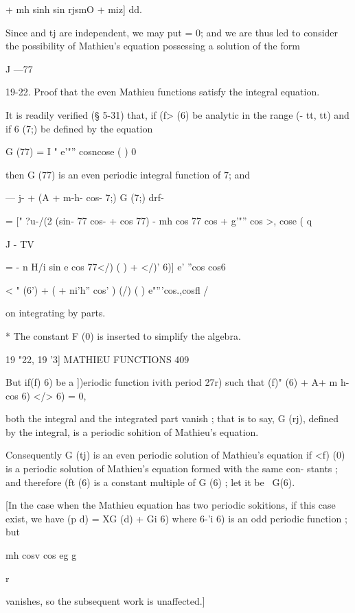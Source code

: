 + mh sinh   sin rjsmO + miz] dd. 

Since   and tj are independent, we may put   = 0; and we are thus led to 
consider the possibility of Mathieu's equation possessing a solution of the 
form 

J —77 

19-22. Proof that the even Mathieu functions satisfy the integral equation. 

It is readily verified (§ 5-31) that, if (f> (6) be analytic in the range (- tt, tt) 
and if 6 (7;) be defined by the equation 

G (77) = I " e'"'' cosncose   ( )  0  

then G (77) is an even periodic integral function of 7; and 

— j-  + (A + m-h- cos- 7;) G (7;) 
drf- 

= ["  ?u-/(2 (sin- 77 cos-   + cos  77) - mh cos 77 cos   +    g'"'' cos >, cose   (  q 

J - TV 

= - n H/i sin e cos 77</) ( ) + </)'  6)] e' ''cos cos6 

 < " (6') + (  + ni'h'' cos' ) (/) ( )  e"'''cos.,cosfl  /  



on integrating by parts. 

* The constant F (0) is inserted to simplify the algebra. 



19 "22, 19 '3] MATHIEU FUNCTIONS 409 

But if(f) 6) be a ])eriodic function  ivith period 27r) such that 
(f)" (6) +  A+ m h- cos  6) </>  6) = 0, 

both the integral and the integrated part vanish ; that is to say, G (rj), defined 
by the integral, is a periodic sohition of Mathieu's equation. 

Consequently G (tj) is an even periodic solution of Mathieu's equation if 
<f) (0) is a periodic solution of Mathieu's equation formed with the same con- 
stants ; and therefore (ft (6) is a constant multiple of G (6) ; let it be \ G(6). 

[In the case when the Mathieu equation has two periodic sokitions, if this case exist, 
we have (p  d) = XG (d) + Gi  6) where 6-'i  6) is an odd periodic function ; but 



 mh cosv cos eg g   

r 

vanishes, so the subsequent work is unaffected.] 

